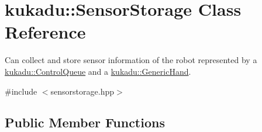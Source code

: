 \hypertarget{classkukadu_1_1SensorStorage}{\section{kukadu\-:\-:Sensor\-Storage Class Reference}
\label{classkukadu_1_1SensorStorage}
}


Can collect and store sensor information of the robot represented by a \hyperlink{classkukadu_1_1ControlQueue}{kukadu\-::\-Control\-Queue} and a \hyperlink{classkukadu_1_1GenericHand}{kukadu\-::\-Generic\-Hand}.  




{\ttfamily \#include $<$sensorstorage.\-hpp$>$}

\subsection*{Public Member Functions}
